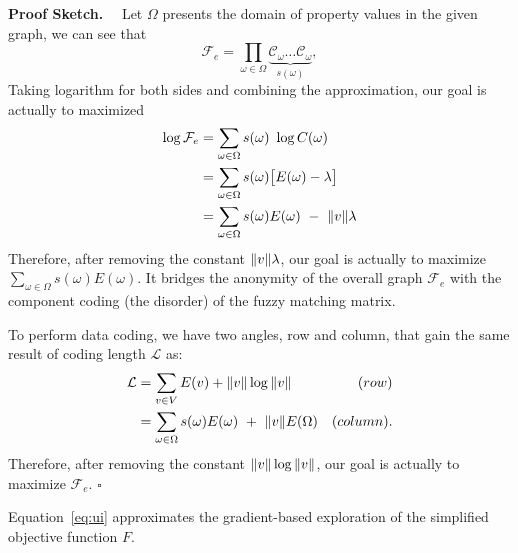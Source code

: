 \textbf{Proof Sketch.}~~
Let $\Omega$ presents the domain of property values in the given graph, 
we can see that 
\begin{equation*}
  \mathcal{F}_{e} = \prod_{\omega \in \Omega} \underbrace{\mathcal{C}_{\omega} \ldots \mathcal{C}_{\omega}}_{s(\omega)}, 
\end{equation*}
Taking logarithm for both sides and combining the approximation, our goal is actually to maximized 
\begin{align*}
  \log \mathcal{F}_{e} &= \sum_{\omega \in \Omega} s(\omega)~\log C(\omega) \\
                       &= \sum_{\omega \in \Omega} s(\omega) \big[ E(\omega) - \lambda \big] \\
                       &= \sum_{\omega \in \Omega} s(\omega) E(\omega) ~-~ \|v\| \lambda 
\end{align*}
Therefore, after removing the constant $\|v\|\lambda$, our goal is actually to maximize 
$\sum_{\omega \in \Omega} s(\omega) E(\omega)$. 
It bridges the anonymity of the overall graph $\mathcal{F}_{e}$ 
with the component coding (the disorder) of the fuzzy matching matrix. 

To perform data coding, we have two angles, row  and column, that gain the same result of coding length $\mathcal{L}$ as:
\begin{align*}
  \mathcal{L} &= \sum_{v \in V} E(v) + \|v\| \log \|v\|                             &(row)\\
              &= \sum_{\omega \in \Omega} s(\omega) E(\omega)~+~\|v\| E(\Omega) &(column). 
\end{align*}
Therefore, after removing the constant $\|v\| \log \|v\|$, our goal is actually to maximize 
$\mathcal{F}_{e}$. $\square$  

\begin{observation}
  Equation~\ref{eq:ui} approximates the gradient-based exploration of the simplified objective function $F$.
\end{observation}

